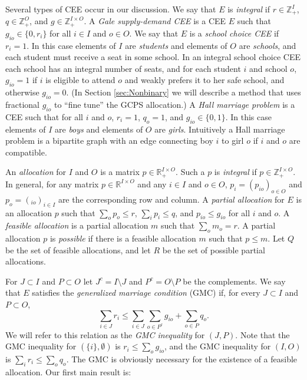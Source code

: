 \documentclass[12pt, A4paper]{article}
\theoremstyle{definition}
\renewcommand{\Re}{\mathbb{R}}
\newcommand{\In}{\mathbb{Z}}
\begin{document}
Several types of CEE occur in our discussion. We say that $E$ is \emph{integral} if $r \in \In_+^I$, $q \in \In_+^O$, and $g \in \In_+^{I \times O}$.  A \emph{Gale supply-demand CEE}  is a CEE $E$ such that $g_{io} \in \{0,r_i\}$ for all $i \in I$ and $o \in O$. We say that $E$ is a \emph{school choice CEE} if $r_i = 1$.   In this case elements of $I$ are \emph{students} and elements of $O$ are \emph{schools}, and each student must receive a seat in some school. In an integral school choice CEE each school has an integral number of seats, and for each student $i$ and school $o$, $g_{io} = 1$ if $i$ is eligible to attend $o$ and weakly prefers it to her safe school, and otherwise $g_{io} = 0$.  (In Section \ref{sec:Nonbinary} we will describe a method that uses fractional $g_{io}$ to ``fine tune'' the GCPS allocation.)
A \emph{Hall marriage problem} is a CEE such that for all $i$ and $o$, $r_i = 1$, $q_o = 1$, and $g_{io} \in \{0,1\}$.   In this case elements of $I$ are \emph{boys} and elements of $O$ are \emph{girls}.
Intuitively a Hall marriage problem is a bipartite graph with an edge connecting boy $i$ to girl $o$ if $i$ and $o$ are compatible.  

An \emph{allocation} for $I$ and $O$ is a
matrix $p \in \Re_+^{I \times O}$.  Such a $p$ is \emph{integral} if $p \in \In_+^{I \times O}$. In general, for any matrix $p \in \Re^{I \times O}$ and any $i \in I$ and $o \in O$, $p_i = (p_{io})_{o \in O}$ and $p_o = (_{io})_{i \in I}$ are the corresponding row and column.  A \emph{partial allocation} for $E$ is an allocation $p$ such that $\sum_o p_o \le r$, $\sum_i p_i \le q$, and $p_{io} \le g_{io}$ for all $i$ and $o$. A \emph{feasible allocation} is a partial allocation $m$ such that $\sum_o m_o = r$. 
A partial allocation $p$ is \emph{possible} if there is a feasible allocation $m$ such that $p \le m$.
Let $Q$ be the set of feasible allocations, and let $R$ be the set of possible partial allocations.

For $J \subset I$ and $P \subset O$ let $J^c = I \setminus J$ and $P^c = O \setminus P$ be the complements.  We say that $E$ satisfies the \emph{generalized marriage condition}
(GMC) if,  for every $J \subset I$ and $P \subset O$,
$$\sum_{i \in J} r_i \le \sum_{i \in J} \sum_{o \in P^c} g_{io} + \sum_{o \in P} q_o.$$  We will refer to this relation as the \emph{GMC inequality} for $(J,P)$.  Note that the GMC inequality for  $(\{i\},\emptyset)$ is  $r_i \le \sum_o g_{io}$,  and the GMC inequality for  $(I,O)$ is  $\sum_i r_i \le \sum_o q_o$.  The GMC is obviously necessary for the existence of a feasible allocation.
Our first main result is:
\end{document}
